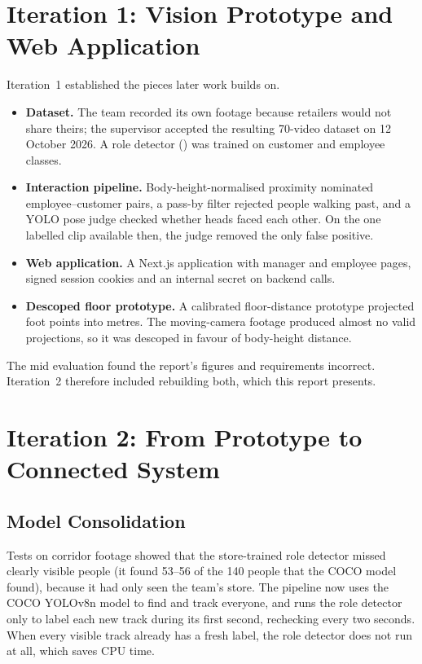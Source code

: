 \section{Iteration 1: Vision Prototype and Web Application}
Iteration~1 established the pieces later work builds on.
\begin{itemize}
\item \textbf{Dataset.} The team recorded its own footage because retailers would not share theirs; the supervisor accepted the resulting 70-video dataset on 12 October 2026. A role detector () was trained on customer and employee classes.
\item \textbf{Interaction pipeline.} Body-height-normalised proximity nominated employee--customer pairs, a pass-by filter rejected people walking past, and a YOLO pose judge checked whether heads faced each other. On the one labelled clip available then, the judge removed the only false positive.
\item \textbf{Web application.} A Next.js application with manager and employee pages, signed session cookies and an internal secret on backend calls.
\item \textbf{Descoped floor prototype.} A calibrated floor-distance prototype projected foot points into metres. The moving-camera footage produced almost no valid projections, so it was descoped in favour of body-height distance.
\end{itemize}
The mid evaluation found the report's figures and requirements incorrect. Iteration~2 therefore included rebuilding both, which this report presents.

\section{Iteration 2: From Prototype to Connected System}

\subsection{Model Consolidation}
Tests on corridor footage showed that the store-trained role detector missed clearly visible people (it found 53--56 of the 140 people that the COCO model found), because it had only seen the team's store. The pipeline now uses the COCO YOLOv8n model to find and track everyone, and runs the role detector only to label each new track during its first second, rechecking every two seconds. When every visible track already has a fresh label, the role detector does not run at all, which saves CPU time.

